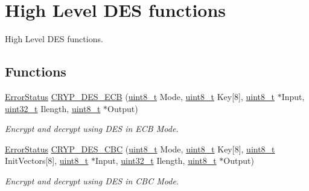 \hypertarget{group___c_r_y_p___group8}{\section{High Level D\-E\-S functions}
\label{group___c_r_y_p___group8}
}


High Level D\-E\-S functions.  


\subsection*{Functions}
\begin{DoxyCompactItemize}
\item 
\hyperlink{group___exported__types_ga8333b96c67f83cba354b3407fcbb6ee8}{Error\-Status} \hyperlink{group___c_r_y_p___group8_ga3b96b7608b39197209abed5f5845f590}{C\-R\-Y\-P\-\_\-\-D\-E\-S\-\_\-\-E\-C\-B} (\hyperlink{stdint_8h_aba7bc1797add20fe3efdf37ced1182c5}{uint8\-\_\-t} Mode, \hyperlink{stdint_8h_aba7bc1797add20fe3efdf37ced1182c5}{uint8\-\_\-t} Key\mbox{[}8\mbox{]}, \hyperlink{stdint_8h_aba7bc1797add20fe3efdf37ced1182c5}{uint8\-\_\-t} $\ast$Input, \hyperlink{stdint_8h_a435d1572bf3f880d55459d9805097f62}{uint32\-\_\-t} Ilength, \hyperlink{stdint_8h_aba7bc1797add20fe3efdf37ced1182c5}{uint8\-\_\-t} $\ast$Output)
\begin{DoxyCompactList}\small\item\em Encrypt and decrypt using D\-E\-S in E\-C\-B Mode. \end{DoxyCompactList}\item 
\hyperlink{group___exported__types_ga8333b96c67f83cba354b3407fcbb6ee8}{Error\-Status} \hyperlink{group___c_r_y_p___group8_ga75724391a8560c557e1152b805f5cad1}{C\-R\-Y\-P\-\_\-\-D\-E\-S\-\_\-\-C\-B\-C} (\hyperlink{stdint_8h_aba7bc1797add20fe3efdf37ced1182c5}{uint8\-\_\-t} Mode, \hyperlink{stdint_8h_aba7bc1797add20fe3efdf37ced1182c5}{uint8\-\_\-t} Key\mbox{[}8\mbox{]}, \hyperlink{stdint_8h_aba7bc1797add20fe3efdf37ced1182c5}{uint8\-\_\-t} Init\-Vectors\mbox{[}8\mbox{]}, \hyperlink{stdint_8h_aba7bc1797add20fe3efdf37ced1182c5}{uint8\-\_\-t} $\ast$Input, \hyperlink{stdint_8h_a435d1572bf3f880d55459d9805097f62}{uint32\-\_\-t} Ilength, \hyperlink{stdint_8h_aba7bc1797add20fe3efdf37ced1182c5}{uint8\-\_\-t} $\ast$Output)
\begin{DoxyCompactList}\small\item\em Encrypt and decrypt using D\-E\-S in C\-B\-C Mode. \end{DoxyCompactList}\end{DoxyCompactItemize}



